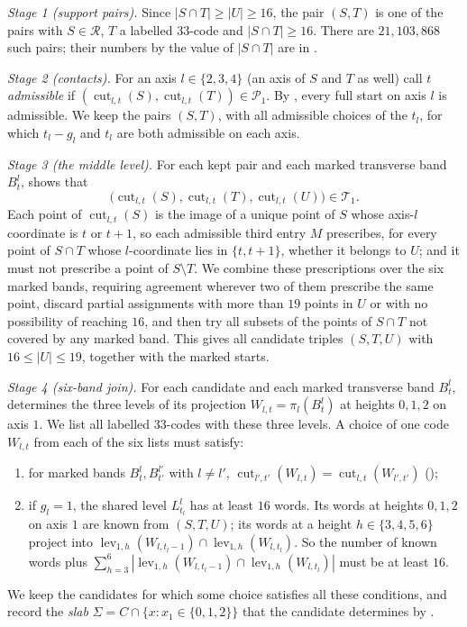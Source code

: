 \documentclass[11pt,colorlinks]{charlie}
\newcommand{\cut}{\operatorname{cut}}
\newcommand{\lev}{\operatorname{lev}}
\newcommand{\cR}{\mathcal{R}}
\begin{document}
\emph{Stage 1 (support pairs).} Since $|S\cap T|\ge|U|\ge16$, the pair $(S,T)$ is one of the pairs with $S\in\cR$, $T$ a labelled $33$-code and $|S\cap T|\ge16$. There are $21{,}103{,}868$ such pairs; their numbers by the value of $|S\cap T|$ are in .

\emph{Stage 2 (contacts).} For an axis $l\in\{2,3,4\}$ (an axis of $S$ and $T$ as well) call $t$ \emph{admissible} if $(\cut_{l,t}(S),\cut_{l,t}(T))\in\mathcal P_1$. By , every full start on axis $l$ is admissible. We keep the pairs $(S,T)$, with all admissible choices of the $t_l$, for which $t_l-g_l$ and $t_l$ are both admissible on each axis.

\emph{Stage 3 (the middle level).} For each kept pair and each marked transverse band $B^l_t$,  shows that
\[
 \big(\cut_{l,t}(S),\cut_{l,t}(T),\cut_{l,t}(U)\big)\in\mathcal T_1 .
\]
Each point of $\cut_{l,t}(S)$ is the image of a unique point of $S$ whose axis-$l$ coordinate is $t$ or $t+1$, so each admissible third entry $M$ prescribes, for every point of $S\cap T$ whose $l$-coordinate lies in $\{t,t+1\}$, whether it belongs to $U$; and it must not prescribe a point of $S\setminus T$. We combine these prescriptions over the six marked bands, requiring agreement wherever two of them prescribe the same point, discard partial assignments with more than $19$ points in $U$ or with no possibility of reaching $16$, and then try all subsets of the points of $S\cap T$ not covered by any marked band. This gives all candidate triples $(S,T,U)$ with $16\le|U|\le19$, together with the marked starts.

\emph{Stage 4 (six-band join).} For each candidate and each marked transverse band $B^l_t$,  determines the three levels of its projection $W_{l,t}=\pi_l(B^l_t)$ at heights $0,1,2$ on axis $1$. We list all labelled $33$-codes with these three levels. A choice of one code $W_{l,t}$ from each of the six lists must satisfy:
\begin{enumerate}
\item for marked bands $B^l_t,B^{l'}_{t'}$ with $l\ne l'$, $\cut_{l',t'}(W_{l,t})=\cut_{l,t}(W_{l',t'})$ ();
\item if $g_l=1$, the shared level $L^l_{t_l}$ has at least $16$ words. Its words at heights $0,1,2$ on axis $1$ are known from $(S,T,U)$; its words at a height $h\in\{3,4,5,6\}$ project into $\lev_{1,h}(W_{l,t_l-1})\cap\lev_{1,h}(W_{l,t_l})$. So the number of known words plus $\sum_{h=3}^6|\lev_{1,h}(W_{l,t_l-1})\cap\lev_{1,h}(W_{l,t_l})|$ must be at least $16$.
\end{enumerate}
We keep the candidates for which some choice satisfies all these conditions, and record the \emph{slab} $\Sigma=C\cap\{x:x_1\in\{0,1,2\}\}$ that the candidate determines by .
\end{document}
